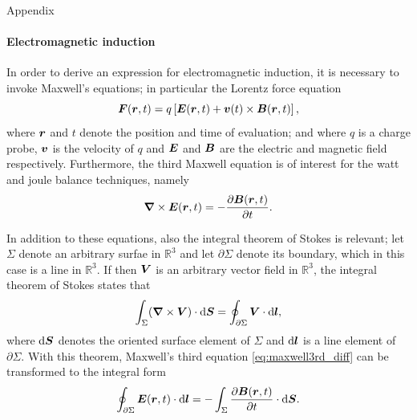 \documentclass{beamer}
\begin{document}
\begin{frame}[allowframebreaks]{Appendix}
\framesubtitle{Electromagnetic induction}
\justifying
 In order to derive an expression for electromagnetic induction, it is necessary to invoke Maxwell's equations; in particular the Lorentz force equation \begin{equation}
		\bm{F}(\bm{r}, t) = q\left[\bm{E}(\bm{r},t) + \bm{v}(t)\times \bm{B}(\bm{r},t)\right],
	\end{equation} where $\bm{r}$ and $t$ denote the position and time of evaluation; and where $q$ is a charge probe, $\bm{v}$ is the velocity of $q$ and $\bm{E}$ and $\bm{B}$ are the electric and magnetic field respectively. Furthermore, the third Maxwell equation is of interest for the watt and joule balance techniques, namely \begin{equation}\label{eq:maxwell3rd_diff}
	\bm{\nabla} \times \bm{E}(\bm{r},t) = -\frac{\partial \bm{B}(\bm{r},t)}{\partial t}.
	\end{equation}
	
	\pagebreak In addition to these equations, also the integral theorem of Stokes is relevant; let $\Sigma$ denote an arbitrary surfae in $\mathbb{R}^3$ and let $\partial \Sigma$ denote its boundary, which in this case is a line in $\mathbb{R}^3$. If then $\bm{V}$ is an arbitrary vector field in $\mathbb{R}^3$, the integral theorem of Stokes states that \begin{equation}
		\int_{\Sigma} (\bm{\nabla} \times \bm{V})\cdot \mathrm{d}\bm{S} = \oint_{\partial \Sigma} \bm{V}\cdot \mathrm{d}\bm{l},
	\end{equation} where $\mathrm{d}\bm{S}$ denotes the oriented surface element of $\Sigma$ and $\mathrm{d}\bm{l}$ is a line element of $\partial \Sigma$. With this theorem, Maxwell's third equation \cref{eq:maxwell3rd_diff} can be transformed to the integral form \begin{equation}
	\label{eq:maxwell3rd_int}
	\oint_{\partial \Sigma} \bm{E}(\bm{r},t)\cdot \mathrm{d}\bm{l} = -\int_{\Sigma} \frac{\partial \bm{B}(\bm{r},t)}{\partial t}\cdot \mathrm{d}\bm{S}.
	\end{equation}
	

\end{frame}
\end{document}
